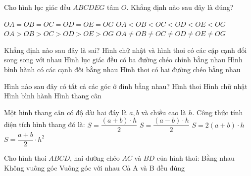 \documentclass[12pt,a4paper]{article}
\begin{document}
\begin{ex}
Cho hình lục giác đều $ABCDEG$ tâm $O$. Khẳng định nào sau đây là đúng?
\begin{center}
\end{center}
\choice
{\True $OA = OB = OC = OD = OE = OG$}
{$OA < OB < OC < OD < OE < OG$}
{$OA > OB > OC > OD > OE > OG$}
{$OA \ne OB \ne OC \ne OD \ne OE \ne OG$}
\end{ex}

\begin{ex}
Khẳng định nào sau đây là sai?
\choice
{Hình chữ nhật và hình thoi có các cặp cạnh đối song song với nhau}
{Hình lục giác đều có ba đường chéo chính bằng nhau}
{Hình bình hành có các cạnh đối bằng nhau}
{\True Hình thoi có hai đường chéo bằng nhau}
\end{ex}

\begin{ex}
Hình nào sau đây có tất cả các góc ở đỉnh bằng nhau?
\choice
{Hình thoi}
{\True Hình chữ nhật}
{Hình bình hành}
{Hình thang cân}
\end{ex}

\begin{ex}
Một hình thang cân có độ dài hai đáy là $a, b$ và chiều cao là $h$. Công thức tính diện tích hình thang đó là:
\choice
{\True $S = \dfrac{(a+b) \cdot h}{2}$}
{$S = \dfrac{(a-b) \cdot h}{2}$}
{$S = 2(a+b) \cdot h$}
{$S = \dfrac{a+b}{2} \cdot h^2$}
\end{ex}

\begin{ex}
Cho hình thoi $ABCD$, hai đường chéo $AC$ và $BD$ của hình thoi:
\choice
{Bằng nhau}
{Không vuông góc}
{\True Vuông góc với nhau}
{Cả A và B đều đúng}
\end{ex}
\end{document}
